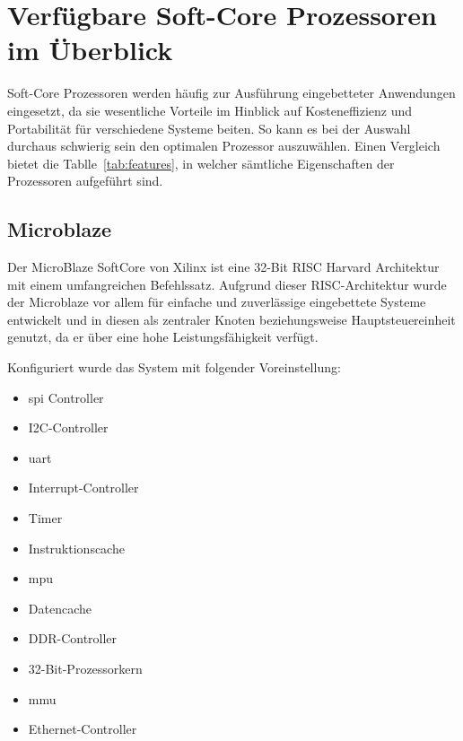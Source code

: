\section{Verfügbare Soft-Core Prozessoren im Überblick}\label{kap:überblick}
Soft-Core Prozessoren werden häufig zur Ausführung eingebetteter Anwendungen eingesetzt, da sie wesentliche Vorteile im Hinblick auf Kosteneffizienz und Portabilität für verschiedene Systeme
beiten. So kann es bei der Auswahl durchaus schwierig sein den optimalen Prozessor auszuwählen. Einen Vergleich bietet die Tablle~\ref{tab:features}, in welcher sämtliche Eigenschaften
der Prozessoren aufgeführt sind.\\

\subsection{Microblaze}\label{kap:microblaze}


Der MicroBlaze SoftCore von Xilinx ist eine 32-Bit RISC Harvard Architektur mit einem umfangreichen Befehlssatz. Aufgrund dieser RISC-Architektur
 wurde der Microblaze vor allem für einfache und zuverlässige eingebettete Systeme entwickelt und in diesen als zentraler Knoten beziehungsweise Hauptsteuereinheit
genutzt, da er über eine hohe Leistungsfähigkeit verfügt.

Konfiguriert wurde das System mit folgender Voreinstellung:~\cite{microblaze}\\
        \begin{itemize}
          \item \ac{spi} Controller
          \item I2C-Controller
          \item \ac{uart}
          \item Interrupt-Controller
          \item  Timer
          \item Instruktionscache
          \item \ac{mpu}
          \item Datencache
          \item DDR-Controller
          \item 32-Bit-Prozessorkern
          \item \ac{mmu}
          \item Ethernet-Controller
        \end{itemize}


